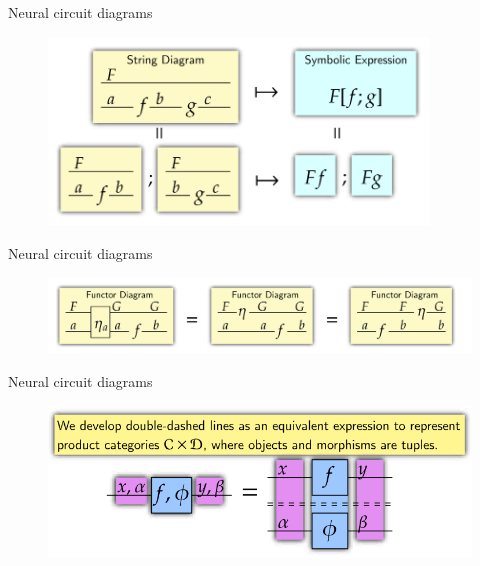 \documentclass{beamer}
\begin{document}
\begin{frame}{Neural circuit diagrams}
    \begin{figure}
        \begin{center}
            \includegraphics[width=0.9\textwidth]{figures/functors.png}
            \caption*{}
        \end{center}
    \end{figure}
\end{frame}

\begin{frame}{Neural circuit diagrams}
    \begin{figure}
        \begin{center}
            \includegraphics[width=\textwidth]{figures/natural_transformations.png}
            \caption*{}
        \end{center}
    \end{figure}
\end{frame}


\begin{frame}{Neural circuit diagrams}
    \begin{figure}
        \begin{center}
            \includegraphics[width=\textwidth]{figures/product_diagram.png}
            \caption*{}
        \end{center}
    \end{figure}
\end{frame}
\end{document}
